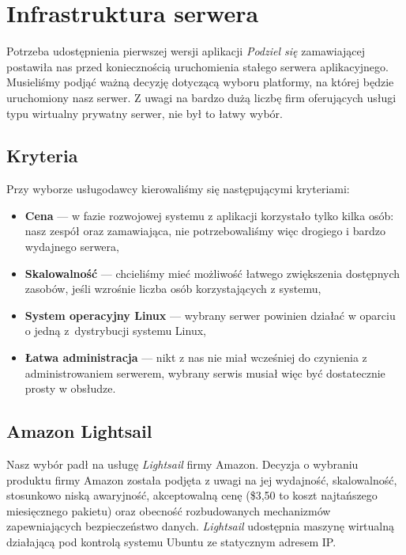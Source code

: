 \documentclass[licencjacka]{pracamgr}
\begin{document}
\newpage

\chapter{Infrastruktura serwera}\label{r:infrastruktura}

Potrzeba udostępnienia pierwszej wersji aplikacji \textit{Podziel się} zamawiającej postawiła nas przed koniecznością uruchomienia stałego serwera aplikacyjnego. Musieliśmy podjąć ważną decyzję dotyczącą wyboru platformy, na której będzie uruchomiony nasz serwer. Z uwagi na bardzo dużą liczbę firm oferujących usługi typu wirtualny prywatny serwer, nie był to łatwy wybór.

\section{Kryteria}
Przy wyborze usługodawcy kierowaliśmy się następującymi kryteriami:
\begin{itemize}
    \item \textbf{Cena} --- w fazie rozwojowej systemu z aplikacji korzystało tylko kilka osób: nasz zespół oraz
    zamawiająca, nie potrzebowaliśmy więc drogiego i bardzo wydajnego serwera,
    \item \textbf{Skalowalność} --- chcieliśmy mieć możliwość łatwego zwiększenia dostępnych zasobów, jeśli
    wzrośnie liczba osób korzystających z systemu,
    \item \textbf{System operacyjny Linux} --- wybrany serwer powinien działać w oparciu o jedną z~dystrybucji
    systemu Linux,
    \item \textbf{Łatwa administracja} --- nikt z nas nie miał wcześniej do czynienia z administrowaniem serwerem, wybrany serwis musiał więc być dostatecznie prosty w obsłudze.
\end{itemize}{}

\section{Amazon Lightsail}

Nasz wybór padł na usługę \textit{Lightsail} firmy Amazon. Decyzja o wybraniu produktu firmy Amazon została podjęta z uwagi na jej wydajność, skalowalność, stosunkowo niską awaryjność, akceptowalną cenę (\$3,50 to koszt najtańszego miesięcznego pakietu) oraz obecność rozbudowanych mechanizmów zapewniających bezpieczeństwo danych. \textit{Lightsail} udostępnia maszynę wirtualną działającą pod kontrolą systemu Ubuntu ze statycznym adresem IP\@.
\end{document}
